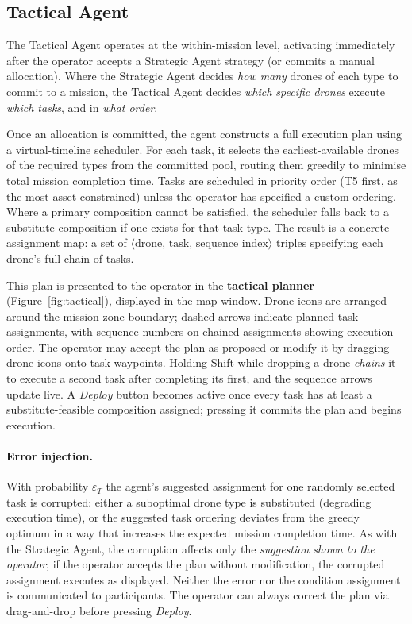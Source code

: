 
\subsection{Tactical Agent}\label{sec:tactical}

The Tactical Agent operates at the within-mission level, activating immediately after the operator accepts a Strategic Agent strategy (or commits a manual allocation). Where the Strategic Agent decides \emph{how many} drones of each type to commit to a mission, the Tactical Agent decides \emph{which specific drones} execute \emph{which tasks}, and in \emph{what order}.

Once an allocation is committed, the agent constructs a full execution plan using a virtual-timeline scheduler. For each task, it selects the earliest-available drones of the required types from the committed pool, routing them greedily to minimise total mission completion time. Tasks are scheduled in priority order (T5 first, as the most asset-constrained) unless the operator has specified a custom ordering. Where a primary composition cannot be satisfied, the scheduler falls back to a substitute composition if one exists for that task type. The result is a concrete assignment map: a set of $\langle\text{drone},\,\text{task},\,\text{sequence index}\rangle$ triples specifying each drone's full chain of tasks.

This plan is presented to the operator in the \textbf{tactical planner} (Figure~\ref{fig:tactical}), displayed in the map window. Drone icons are arranged around the mission zone boundary; dashed arrows indicate planned task assignments, with sequence numbers on chained assignments showing execution order. The operator may accept the plan as proposed or modify it by dragging drone icons onto task waypoints. Holding Shift while dropping a drone \emph{chains} it to execute a second task after completing its first, and the sequence arrows update live. A \textit{Deploy} button becomes active once every task has at least a substitute-feasible composition assigned; pressing it commits the plan and begins execution.

\paragraph{Error injection.}
With probability $\varepsilon_T$ the agent's suggested assignment for one randomly selected task is corrupted: either a suboptimal drone type is substituted (degrading execution time), or the suggested task ordering deviates from the greedy optimum in a way that increases the expected mission completion time. As with the Strategic Agent, the corruption affects only the \emph{suggestion shown to the operator}; if the operator accepts the plan without modification, the corrupted assignment executes as displayed. Neither the error nor the condition assignment is communicated to participants. The operator can always correct the plan via drag-and-drop before pressing \textit{Deploy}.

